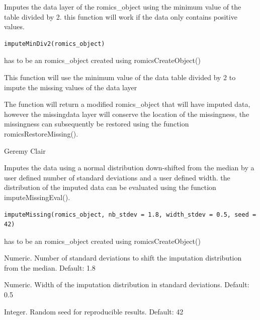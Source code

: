 \documentclass[a4paper]{book}
\begin{document}
%
\begin{Description}
Imputes the data layer of the romics\_object using the minimum value of the table divided by 2. this function will work if the data only contains positive values.
\end{Description}
%
\begin{Usage}
\begin{verbatim}
imputeMinDiv2(romics_object)
\end{verbatim}
\end{Usage}
%
\begin{Arguments}
\begin{ldescription}
\item[\code{romics\_object}] has to be an romics\_object created using romicsCreateObject()
\end{ldescription}
\end{Arguments}
%
\begin{Details}
This function will use the minimum value of the data table divided by 2 to impute the missing values of the data layer
\end{Details}
%
\begin{Value}
The function will return a modified romics\_object that will have imputed data, however the missingdata layer will conserve the location of the missingness, the missingness can subsequently be restored using the function romicsRestoreMissing().
\end{Value}
%
\begin{Author}
Geremy Clair
\end{Author}
%
\begin{Description}
Imputes the data using a normal distribution down-shifted from the median by a user defined number of standard deviations and a user defined width. the distribution of the imputed data can be evaluated using the function imputeMissingEval().
\end{Description}
%
\begin{Usage}
\begin{verbatim}
imputeMissing(romics_object, nb_stdev = 1.8, width_stdev = 0.5, seed = 42)
\end{verbatim}
\end{Usage}
%
\begin{Arguments}
\begin{ldescription}
\item[\code{romics\_object}] has to be an romics\_object created using romicsCreateObject()

\item[\code{nb\_stdev}] Numeric. Number of standard deviations to shift the imputation distribution from the median. Default: 1.8

\item[\code{width\_stdev}] Numeric. Width of the imputation distribution in standard deviations. Default: 0.5

\item[\code{seed}] Integer. Random seed for reproducible results. Default: 42
\end{ldescription}
\end{Arguments}
\end{document}
